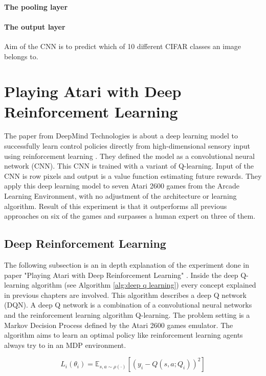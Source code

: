 \documentclass[conference]{IEEEtran}
\begin{document}
\paragraph{The pooling layer} 

\paragraph{The output layer} Aim of the CNN is to predict which of 10 different CIFAR classes an image belongs to.

\section{Playing Atari with Deep Reinforcement Learning}
The paper from DeepMind Technologies is about a deep learning model to successfully learn control policies directly from high-dimensional sensory input using reinforcement learning \cite{mnih-atari-2013}. They defined the model as a convolutional neural network (CNN). This CNN is trained with a variant of Q-learning. Input of the CNN is row pixels and output is a value function estimating future rewards. They apply this deep learning model to seven Atari 2600 games from the Arcade Learning Environment, with no adjustment of the architecture or learning algorithm. Result of this experiment is that it outperforms all previous approaches on six of the games and surpasses a human expert on three of them. 

\subsection{Deep Reinforcement Learning}
The following subsection is an in depth explanation of the experiment done in paper "Playing Atari with Deep Reinforcement Learning" \cite{mnih-atari-2013}. Inside the deep Q-learning algorithm (see Algorithm \ref{alg:deep q learning}) every concept explained in previous chapters are involved. This algorithm describes a deep Q network (DQN). A deep Q network is a combination of a convolutional neural networks and the reinforcement learning algorithm Q-learning. The problem setting is a Markov Decision Process defined by the Atari 2600 games emulator. The algorithm aims to learn an optimal policy like reinforcement learning agents always try to in an MDP environment.

\begin{equation} \label{equ:loss functions}
L_i(\theta_i) = \mathbb{E}_{s,a \sim \rho(\cdot)} [(y_i - Q(s,a;Q_i))^2]
\end{equation}
\end{document}
